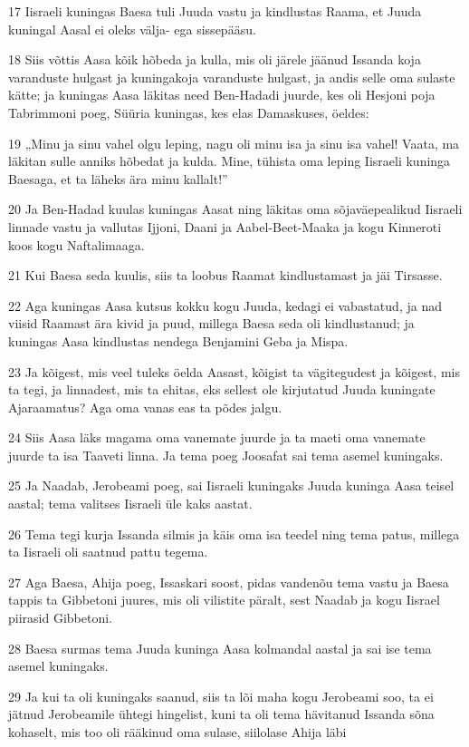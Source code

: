 \par 17 Iisraeli kuningas Baesa tuli Juuda vastu ja kindlustas Raama, et Juuda kuningal Aasal ei oleks välja- ega sissepääsu.
\par 18 Siis võttis Aasa kõik hõbeda ja kulla, mis oli järele jäänud Issanda koja varanduste hulgast ja kuningakoja varanduste hulgast, ja andis selle oma sulaste kätte; ja kuningas Aasa läkitas need Ben-Hadadi juurde, kes oli Hesjoni poja Tabrimmoni poeg, Süüria kuningas, kes elas Damaskuses, öeldes:
\par 19 „Minu ja sinu vahel olgu leping, nagu oli minu isa ja sinu isa vahel! Vaata, ma läkitan sulle anniks hõbedat ja kulda. Mine, tühista oma leping Iisraeli kuninga Baesaga, et ta läheks ära minu kallalt!”
\par 20 Ja Ben-Hadad kuulas kuningas Aasat ning läkitas oma sõjaväepealikud Iisraeli linnade vastu ja vallutas Ijjoni, Daani ja Aabel-Beet-Maaka ja kogu Kinneroti koos kogu Naftalimaaga.
\par 21 Kui Baesa seda kuulis, siis ta loobus Raamat kindlustamast ja jäi Tirsasse.
\par 22 Aga kuningas Aasa kutsus kokku kogu Juuda, kedagi ei vabastatud, ja nad viisid Raamast ära kivid ja puud, millega Baesa seda oli kindlustanud; ja kuningas Aasa kindlustas nendega Benjamini Geba ja Mispa.
\par 23 Ja kõigest, mis veel tuleks öelda Aasast, kõigist ta vägitegudest ja kõigest, mis ta tegi, ja linnadest, mis ta ehitas, eks sellest ole kirjutatud Juuda kuningate Ajaraamatus? Aga oma vanas eas ta põdes jalgu.
\par 24 Siis Aasa läks magama oma vanemate juurde ja ta maeti oma vanemate juurde ta isa Taaveti linna. Ja tema poeg Joosafat sai tema asemel kuningaks.
\par 25 Ja Naadab, Jerobeami poeg, sai Iisraeli kuningaks Juuda kuninga Aasa teisel aastal; tema valitses Iisraeli üle kaks aastat.
\par 26 Tema tegi kurja Issanda silmis ja käis oma isa teedel ning tema patus, millega ta Iisraeli oli saatnud pattu tegema.
\par 27 Aga Baesa, Ahija poeg, Issaskari soost, pidas vandenõu tema vastu ja Baesa tappis ta Gibbetoni juures, mis oli vilistite päralt, sest Naadab ja kogu Iisrael piirasid Gibbetoni.
\par 28 Baesa surmas tema Juuda kuninga Aasa kolmandal aastal ja sai ise tema asemel kuningaks.
\par 29 Ja kui ta oli kuningaks saanud, siis ta lõi maha kogu Jerobeami soo, ta ei jätnud Jerobeamile ühtegi hingelist, kuni ta oli tema hävitanud Issanda sõna kohaselt, mis too oli rääkinud oma sulase, siilolase Ahija läbi
